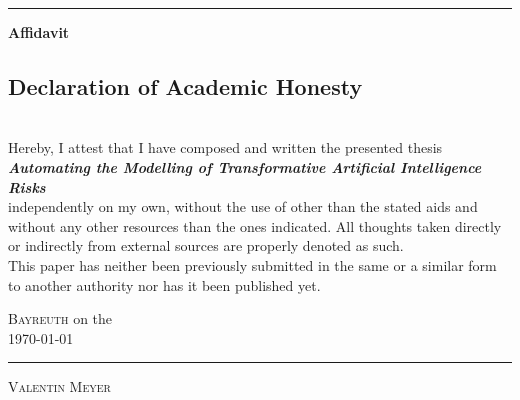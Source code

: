 \documentclass[
  letterpaper,
]{book}
\begin{document}
\vspace{1.5cm}
\hrule
\vspace{2.5cm}


  \LARGE\textbf{Affidavit}
\vspace{1.5cm}

\center

\normalsize


    \subsection*{\Large Declaration of Academic Honesty}
	    \vspace{1cm}\noindent \\
	    Hereby, I attest that I have composed and written the presented thesis 
        \vspace*{0.5cm}\noindent \\
        \textit{ \textbf{ Automating the Modelling of Transformative Artificial Intelligence Risks }}
        \vspace*{0.5cm}\noindent \\
        independently on my own, without the use of other than the stated aids and without any other resources than the ones indicated. All thoughts taken directly or indirectly from external sources are properly denoted as such.
	    \vspace{\baselineskip}
	    \\  This paper has neither been previously submitted in the same or a similar form to another authority nor has it been published yet.
	    \vspace{2cm}
	    
    \flushright
    \begin{minipage}{0.5\textwidth}
        \begin{flushleft} \large
        \textsc{Bayreuth}                     %
        on the \\ %
        \today           %
        \vspace{2cm}\\
    	{\rule[-3pt]{\linewidth}{.4pt}\par\smallskip  
        \textsc{Valentin Meyer}	\\         %
    	}
        \end{flushleft}
        \end{minipage}
\end{document}

